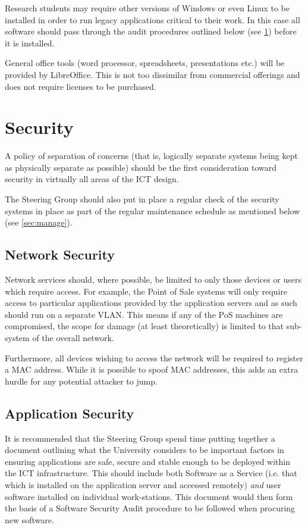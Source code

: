 \documentclass[a4paper, twoside]{article}
\begin{document}
Research students may require other versions of Windows or even Linux to be
installed in order to run legacy applications critical to their work. In this
case all software should pass through the audit procedures outlined below (see
\ref{sec:security}) before it is installed.

General office tools (word processor, spreadsheets, presentations etc.) will be
provided by LibreOffice. This is not too dissimilar from commercial offerings
and does not require licenses to be purchased.

\section{Security}
\label{sec:security}
A policy of separation of concerns (that is, logically separate systems being
kept as physically separate as possible) should be the first consideration
toward security in virtually all areas of the ICT design.

The Steering Group should also put in place a regular check of the security
systems in place as part of the regular maintenance schedule as mentioned below
(see \ref{sec:manage}).

\subsection{Network Security}
Network services should, where possible, be limited to only those devices or
users which require access. For example, the Point of Sale systems will only
require access to particular applications provided by the application servers
and as such should run on a separate VLAN. This means if any of the PoS
machines are compromised, the scope for damage (at least theoretically) is
limited to that sub-system of the overall network.

Furthermore, all devices wishing to access the network will be required to
register a MAC address. While it is possible to spoof MAC addresses, this adds
an extra hurdle for any potential attacker to jump.

\subsection{Application Security}
It is recommended that the Steering Group spend time putting together a document
outlining what the University considers to be important factors in ensuring
applications are safe, secure and stable enough to be deployed within the ICT
infrastructure. This should include both Software as a Service (i.e. that which
is installed on the application server and accessed remotely) \emph{and} user
software installed on individual work-stations. This document would then form
the basis of a Software Security Audit procedure to be followed when procuring new
software.
\end{document}
